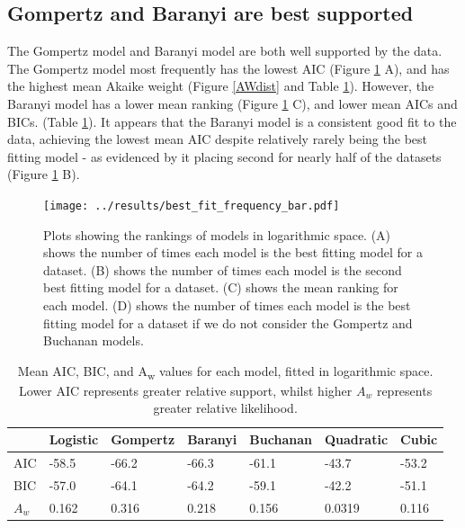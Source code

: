 \documentclass[11pt, a4paper]{article}
\begin{document}
\begin{linenumbers}
\subsection{Gompertz and Baranyi are best supported}

The Gompertz model and Baranyi model are both well supported by the data. The Gompertz model most frequently has the lowest AIC (Figure \ref{fig:bestbars} A), and has the highest mean Akaike weight (Figure \ref{AWdist} and Table \ref{tab:meanAICBIC}). However, the Baranyi model has a lower mean ranking (Figure \ref{fig:bestbars} C), and lower mean AICs and BICs. (Table \ref{tab:meanAICBIC}). It appears that the Baranyi model is a consistent good fit to the data, achieving the lowest mean AIC despite relatively rarely being the best fitting model - as evidenced by it placing second for nearly half of the datasets (Figure \ref{fig:bestbars} B).



        \begin{figure}[H]
        \texttt{[image: ../results/best\_fit\_frequency\_bar.pdf]}
        \caption{Plots showing the rankings of models in logarithmic space. (A) shows the number of times each model is the best fitting model for a dataset. (B) shows the number of times each model is the second best fitting model for a dataset. (C) shows the mean ranking for each model. (D) shows the number of times each model is the best fitting model for a dataset if we do not consider the Gompertz and Buchanan models. }
        \label{fig:bestbars}
        \end{figure}
        
         \begin{table}[H]
\centering
\begin{tabular}{l|llllll}
       & Logistic & Gompertz & Baranyi & Buchanan & Quadratic & Cubic \\ \hline
AIC & -58.5    & -66.2    & -66.3   & -61.1    & -43.7     & -53.2 \\
BIC & -57.0    & -64.1    & -64.2   & -59.1    & -42.2     & -51.1 \\
$A_w$ & 0.162     & 0.316     & 0.218   & 0.156     & 0.0319     & 0.116
\end{tabular}
\caption{Mean AIC, BIC, and A\textsubscript{w}  values for each model, fitted in logarithmic space. Lower AIC represents greater relative support, whilst higher $A_w$ represents greater relative likelihood.}
\label{tab:meanAICBIC}
\end{table}





\end{linenumbers}
\end{document}
